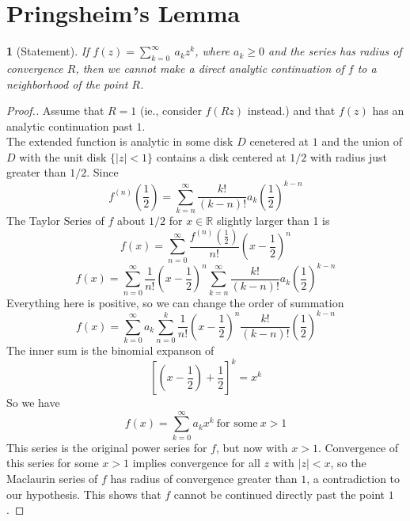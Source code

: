 \documentclass[12pt]{article}
\theoremstyle{named}
\newtheorem*{theorem}{}
\begin{document}
%

\section{Pringsheim's Lemma}
\begin{theorem}[Statement]
	If $f(z) = \sum_{k=0}^{\infty} ~a_{k}z^{k}$, where $a_k \geq 0$ and the series has radius of convergence
	$R$, then we cannot make a direct analytic continuation of $f$ to a neighborhood of the point $R$.
\end{theorem}
\begin{proof}[Proof.]
Assume that $R = 1$ (ie., consider $f(Rz)$ instead.) and that $f(z)$ has an analytic continuation past $1$.
\\ The extended function is analytic in some disk $D$ cenetered at $1$ and the union of $D$ with the unit disk
 $\{|z| < 1\}$ contains a disk centered at $1/2$ with radius just greater than $1/2$. Since
$$ f^{(n)}\left(\frac{1}{2}\right) = \sum_{k=n}^{\infty} \frac{k!}{(k-n)!} a_k \left(\frac{1}{2}\right)^{k-n} $$
The Taylor Series of $f$ about $1/2$ for $x \in \mathbb{R}$ slightly larger than 1 is
$$ f(x) = \sum_{n=0}^{\infty} \frac{f^{(n)}\left(\frac{1}{2}\right)}{n!} \left(x - \frac{1}{2} \right)^n $$
$$ f(x) = \sum_{n=0}^{\infty} \frac{1}{n!} \left(x - \frac{1}{2} \right)^n \sum_{k=n}^{\infty} \frac{k!}{(k-n)!} a_k \left(\frac{1}{2}\right)^{k-n} $$
Everything here is positive, so we can change the order of summation
$$ f(x) = \sum_{k=0}^{\infty} a_k \sum_{n=0}^{k} \frac{1}{n!} \left(x-\frac{1}{2} \right)^n \frac{k!}{(k-n)!} \left(\frac{1}{2}\right)^{k-n} $$
The inner sum is the binomial expanson of
$$ \left[ \left(x-\frac{1}{2} \right) + \frac{1}{2} \right]^k = x^k $$
So we have
$$ f(x) = \sum_{k=0}^{\infty} a_k x^k ~\text{for some}~ x > 1 $$
This series is the original power series for $f$, but now with $x > 1$.  Convergence of this series for some
$x > 1$ implies convergence for all $z$ with $|z| < x$, so the Maclaurin series of $f$ has radius of convergence
greater than $1$, a contradiction to our hypothesis.  This shows that $f$ cannot be continued directly past
the point $1$.
\end{proof}

%
\end{document}
